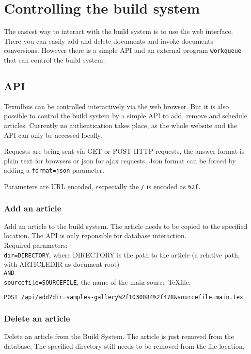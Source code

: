 \documentclass[a4paper]{article}
\begin{document}
\section{Controlling the build system}

The easiest way to interact with the build system is to use the web interface. There you can easily add and delete documents and invoke documents conversions. 
However there is a simple API and an external program \texttt{workqueue} that can control the build system. 

\subsection{API}

Texmlbus can be controlled interactively via the web browser. But it is also possible
to control the build system by a simple API to add, remove and schedule articles. Currently no authentication takes place, as the whole website and the API can only be accessed locally.

Requests are being sent via GET or POST HTTP requests, the answer format is plain text for browsers or json for ajax requests. Json format can be forced by adding a \texttt{format=json} parameter.

Parameters are URL encoded, escpecially the \texttt{/} is encoded as \texttt{\%2f}.
\subsubsection{Add an article}
Add an article to the build system. The article needs to be copied to the specified location. The API is only reponsible for database interaction.\\

Required parameters:\\
\texttt{dir=DIRECTORY}, where DIRECTORY is the path to the article (a relative path, with ARTICLEDIR as document root)\\
\texttt{AND}\\
\texttt{sourcefile=SOURCEFILE}, the name of the main source \TeX file.

\begin{verbatim}
POST /api/add?dir=samples-gallery%2f1030084%2f478&sourcefile=main.tex
\end{verbatim}

\subsubsection{Delete an article}
Delete an article from the Build System. The article is just removed from the database, The specified directory still needs to be removed from the file location. 
\end{document}
